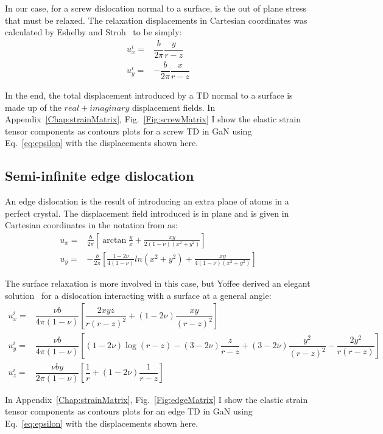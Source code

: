  In our case, for a screw dislocation normal to a surface, is the out of plane stress that must be relaxed. The relaxation displacements in Cartesian coordinates was calculated by Eshelby and Stroh~\cite{Eshelby51} to be simply:
\begin{align}
u^i_x =& \dfrac{b}{2\pi}\dfrac{y}{r-z}\\
u^i_y =& -\dfrac{b}{2\pi}\dfrac{x}{r-z}
\end{align}

In the end, the total displacement introduced by a TD normal to a surface is made up of the $real+imaginary$ displacement fields.  
In Appendix~\ref{Chap:strainMatrix}, Fig.~\ref{Fig:screwMatrix} I show the elastic strain tensor components as contours plots for a screw TD in GaN using Eq.~\ref{eq:epsilon} with the displacements shown here.



\subsection{Semi-infinite edge dislocation}

An edge dislocation is the result of introducing an extra plane of atoms in a perfect crystal. The displacement field introduced is in plane and is given in Cartesian coordinates in the notation from \cite{Indenbom} as:
\begin{align}
    u_x =& \frac{ b }{2\pi} \left[\arctan{\frac{y}{x}} + \frac{xy}{2(1-\nu)(x^2+y^2)}\right]\\
     u_y =& -\frac{ b }{2\pi} \left[\frac{1-2\nu}{4(1-\nu)}ln(x^2+y^2) + \frac{xy}{4(1-\nu)(x^2+y^2)}\right]
\end{align}

The surface relaxation is more involved in this case, but Yoffee derived an elegant solution~\cite{Yoffe} for a dislocation interacting with a surface at a general angle:
\begin{align}
u^i_x =& \dfrac{\nu b}{4 \pi(1-\nu)} \left[\dfrac{2xyz}{r(r-z)^2}+(1-2\nu)\dfrac{xy}{(r-z)^2}\right] \\
u^i_y =& \dfrac{\nu b}{4 \pi(1-\nu)} \left[(1-2\nu)\log(r-z) - (3-2\nu)\dfrac{z}{r-z} + (3-2\nu)\dfrac{y^2}{(r-z)^2} - \dfrac{2y^2}{r(r-z)}\right] \\
u^i_z =& \dfrac{\nu b y}{2\pi(1-\nu)} \left[\dfrac{1}{r} + (1-2\nu)\dfrac{1}{r-z}\right]
\end{align}

In Appendix~\ref{Chap:strainMatrix}, Fig.~\ref{Fig:edgeMatrix} I show the elastic strain tensor components as contours plots for an edge TD in GaN using Eq.~\ref{eq:epsilon}  with the displacements shown here.




